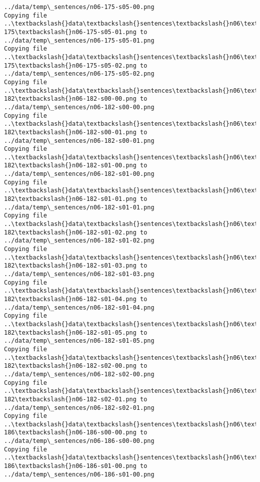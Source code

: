 \documentclass[11pt]{article}
\begin{document}
\begin{Verbatim}[commandchars=\\\{\}]
../data/temp\_sentences/n06-175-s05-00.png
Copying file ..\textbackslash{}data\textbackslash{}sentences\textbackslash{}n06\textbackslash{}n06-175\textbackslash{}n06-175-s05-01.png to
../data/temp\_sentences/n06-175-s05-01.png
Copying file ..\textbackslash{}data\textbackslash{}sentences\textbackslash{}n06\textbackslash{}n06-175\textbackslash{}n06-175-s05-02.png to
../data/temp\_sentences/n06-175-s05-02.png
Copying file ..\textbackslash{}data\textbackslash{}sentences\textbackslash{}n06\textbackslash{}n06-182\textbackslash{}n06-182-s00-00.png to
../data/temp\_sentences/n06-182-s00-00.png
Copying file ..\textbackslash{}data\textbackslash{}sentences\textbackslash{}n06\textbackslash{}n06-182\textbackslash{}n06-182-s00-01.png to
../data/temp\_sentences/n06-182-s00-01.png
Copying file ..\textbackslash{}data\textbackslash{}sentences\textbackslash{}n06\textbackslash{}n06-182\textbackslash{}n06-182-s01-00.png to
../data/temp\_sentences/n06-182-s01-00.png
Copying file ..\textbackslash{}data\textbackslash{}sentences\textbackslash{}n06\textbackslash{}n06-182\textbackslash{}n06-182-s01-01.png to
../data/temp\_sentences/n06-182-s01-01.png
Copying file ..\textbackslash{}data\textbackslash{}sentences\textbackslash{}n06\textbackslash{}n06-182\textbackslash{}n06-182-s01-02.png to
../data/temp\_sentences/n06-182-s01-02.png
Copying file ..\textbackslash{}data\textbackslash{}sentences\textbackslash{}n06\textbackslash{}n06-182\textbackslash{}n06-182-s01-03.png to
../data/temp\_sentences/n06-182-s01-03.png
Copying file ..\textbackslash{}data\textbackslash{}sentences\textbackslash{}n06\textbackslash{}n06-182\textbackslash{}n06-182-s01-04.png to
../data/temp\_sentences/n06-182-s01-04.png
Copying file ..\textbackslash{}data\textbackslash{}sentences\textbackslash{}n06\textbackslash{}n06-182\textbackslash{}n06-182-s01-05.png to
../data/temp\_sentences/n06-182-s01-05.png
Copying file ..\textbackslash{}data\textbackslash{}sentences\textbackslash{}n06\textbackslash{}n06-182\textbackslash{}n06-182-s02-00.png to
../data/temp\_sentences/n06-182-s02-00.png
Copying file ..\textbackslash{}data\textbackslash{}sentences\textbackslash{}n06\textbackslash{}n06-182\textbackslash{}n06-182-s02-01.png to
../data/temp\_sentences/n06-182-s02-01.png
Copying file ..\textbackslash{}data\textbackslash{}sentences\textbackslash{}n06\textbackslash{}n06-186\textbackslash{}n06-186-s00-00.png to
../data/temp\_sentences/n06-186-s00-00.png
Copying file ..\textbackslash{}data\textbackslash{}sentences\textbackslash{}n06\textbackslash{}n06-186\textbackslash{}n06-186-s01-00.png to
../data/temp\_sentences/n06-186-s01-00.png

\end{Verbatim}
\end{document}
